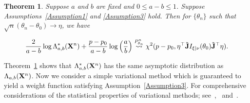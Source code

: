 \documentclass[11pt]{article}
\theoremstyle{plain}
\newtheorem{theorem}{\quad\quad Theorem}
\theoremstyle{definition}
\theoremstyle{remark}
\begin{document}
\begin{theorem}\label{theoremMain}
    Suppose $a$ and $b$ are fixed and $0\leq a-b\leq 1$.
    Suppose Assumptions~\ref{Assumption1} and \ref{Assumption3} hold.
    Then for $\{\theta_n\}$ such that $\sqrt{n}(\theta_n-\theta_0)\to \eta$, we have

        $$
        \frac{2}{a-b}
        \log \Lambda^*_{a,b} (\mathbf{X}^n) 
        +\frac{p-p_0}{a-b}\log \left(\frac{a}{b}\right)
        \overset{P^n_{\theta_n}}{\rightsquigarrow}
        \chi^2(p-p_0, \eta^\top\tilde {\mathbf{J}} I_{\xi|\nu}(\theta_0) \tilde{\mathbf{J}}^\top\eta ).
        $$
\end{theorem}
Theorem~\ref{theoremMain} shows that $\Lambda_{a,b}^* (\mathbf{X}^n)$ has the same asymptotic distribution as $\Lambda_{a,b} (\mathbf{X}^n)$.
Now we consider a simple variational method which is guaranteed to yield a weight function satisfying Assumption~\ref{Assumption3}.
For comprehensive considerations of the statistical properties of variational methods; see~\cite{yixin2017},~\cite{pati2017} and~\cite{yunyang2017}.

\end{document}
